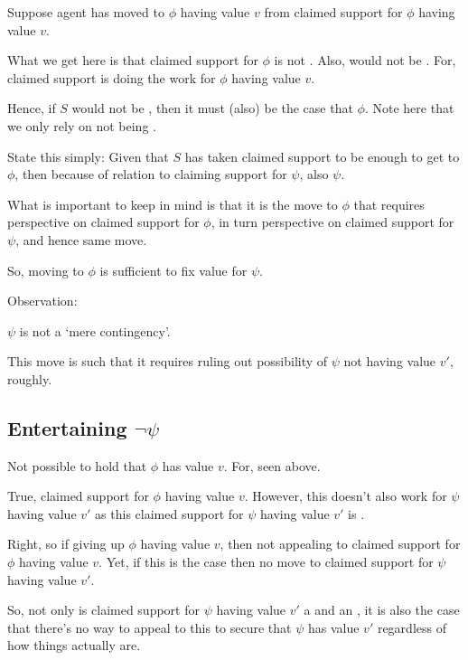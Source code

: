 \begin{note}
  Suppose agent has moved to \(\phi\) having value \(v\) from claimed support for \(\phi\) having value \(v\).

  What we get here is that claimed support for \(\phi\) is not \misled{}.
  Also, would not be \mistaken{}.
  For, claimed support is doing the work for \(\phi\) having value \(v\).


  Hence, if \(S\) would not be \mistaken{}, then it must (also) be the case that \(\phi\).
  Note here that we only rely on not being \misled{}.

  State this simply:
  Given that \(S\) has taken claimed support to be enough to get to \(\phi\), then because of relation to claiming support for \(\psi\), also \(\psi\).

  What is important to keep in mind is that it is the move to \(\phi\) that requires perspective on claimed support for \(\phi\), in turn perspective on claimed support for \(\psi\), and hence same move.

  So, moving to \(\phi\) is sufficient to fix value for \(\psi\).
\end{note}

\begin{note}
  Observation:

  \(\psi\) is not a `mere contingency'.

  This move is such that it requires ruling out possibility of \(\psi\) not having value \(v'\), roughly.
\end{note}

\subsection{Entertaining \(\lnot\psi\)}

\begin{note}
  Not possible to hold that \(\phi\) has value \(v\).
  For, seen above.
\end{note}

\begin{note}
  True, claimed support for \(\phi\) having value \(v\).
  However, this doesn't also work for \(\psi\) having value \(v'\) as this claimed support for \(\psi\) having value \(v'\) is \expec{}.

  Right, so if giving up \(\phi\) having value \(v\), then not appealing to claimed support for \(\phi\) having value \(v\).
  Yet, if this is the case then no move to claimed support for \(\psi\) having value \(v'\).

  So, not only is claimed support for \(\psi\) having value \(v'\) a \requ{} and an \expec{}, it is also the case that there's no way to appeal to this to secure that \(\psi\) has value \(v'\) regardless of how things actually are.
\end{note}

